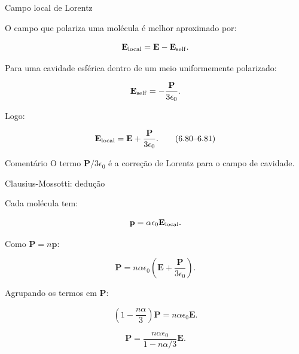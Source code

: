 \documentclass[aspectratio=169]{beamer}
\begin{document}
\begin{frame}{Campo local de Lorentz}

\small

O campo que polariza uma molécula é melhor aproximado por:

\[
\mathbf E_{\rm local}
=
\mathbf E
-
\mathbf E_{\rm self}.
\]

Para uma cavidade esférica dentro de um meio uniformemente polarizado:

\[
\mathbf E_{\rm self}
=
-\frac{\mathbf P}{3\epsilon_0}.
\]

Logo:

\begin{eqbox}
\begin{equation}
\mathbf E_{\rm local}
=
\mathbf E
+
\frac{\mathbf P}{3\epsilon_0}.
\tag{6.80--6.81}
\label{eq:campo-local-lorentz}
\end{equation}
\end{eqbox}

\begin{mybox}{Comentário}
O termo \(\mathbf P/3\epsilon_0\) é a correção de Lorentz para o campo de cavidade.
\end{mybox}

\end{frame}

\begin{frame}{Clausius-Mossotti: dedução}

\small

Cada molécula tem:

\[
\mathbf p=\alpha\epsilon_0\mathbf E_{\rm local}.
\]

Como \(\mathbf P=n\mathbf p\):

\[
\mathbf P
=
n\alpha\epsilon_0
\left(
\mathbf E+\frac{\mathbf P}{3\epsilon_0}
\right).
\]

Agrupando os termos em \(\mathbf P\):

\[
\left(1-\frac{n\alpha}{3}\right)\mathbf P
=
n\alpha\epsilon_0\mathbf E.
\]

\begin{eqbox}
\begin{equation}
\mathbf P
=
\frac{n\alpha\epsilon_0}{1-n\alpha/3}\mathbf E.
\tag{6.82}
\end{equation}
\end{eqbox}

\end{frame}
\end{document}

